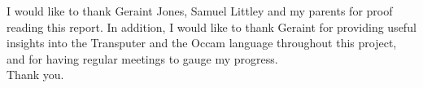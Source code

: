 I would like to thank Geraint Jones, Samuel Littley and my parents for proof
reading this report. In addition, I would like to thank Geraint for providing
useful insights into the Transputer and the Occam language throughout this
project, and for having regular meetings to gauge my progress.
\\

\noindent
Thank you.
